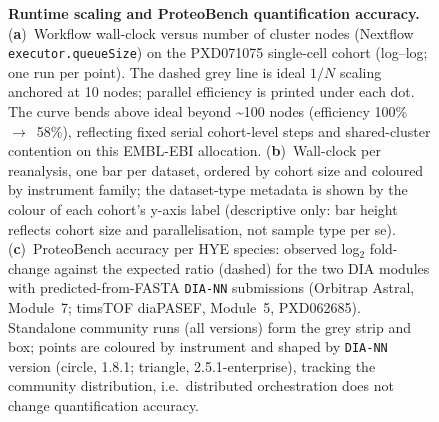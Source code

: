 \documentclass[preprint,12pt]{elsarticle}
\begin{document}
\begin{figure}[htbp]
  \centering
  \caption[Scaling and ProteoBench accuracy]{%
    \textbf{Runtime scaling and ProteoBench quantification accuracy.}
    (\textbf{a})~Workflow wall-clock versus number of cluster nodes (Nextflow
    \texttt{executor.queueSize}) on the PXD071075 single-cell cohort (log--log;
    one run per point). The dashed grey line is ideal $1{/}N$ scaling anchored at
    10 nodes; parallel efficiency is printed under each dot. The curve bends above
    ideal beyond \textasciitilde 100 nodes (efficiency 100\%~$\to$~58\%), reflecting
    fixed serial cohort-level steps and shared-cluster contention on this EMBL-EBI
    allocation.
    (\textbf{b})~Wall-clock per reanalysis, one bar per dataset, ordered by cohort
    size and coloured by instrument family; the dataset-type metadata is shown by
    the colour of each cohort's y-axis label (descriptive only: bar height reflects
    cohort size and parallelisation, not sample type per se).
    (\textbf{c})~ProteoBench accuracy per HYE species: observed log$_2$ fold-change
    against the expected ratio (dashed) for the two DIA modules with
    predicted-from-FASTA \texttt{DIA-NN} submissions (Orbitrap Astral, Module~7;
    timsTOF diaPASEF, Module~5, PXD062685). Standalone community runs (all versions) form
    the grey strip and box; \quantmsdiann{} points are coloured by instrument and
    shaped by \texttt{DIA-NN} version (circle, 1.8.1; triangle, 2.5.1-enterprise),
    tracking the community distribution, i.e.\ distributed orchestration does not
    change quantification accuracy.
  }
  \label{fig:validation}
\end{figure}
\end{document}
